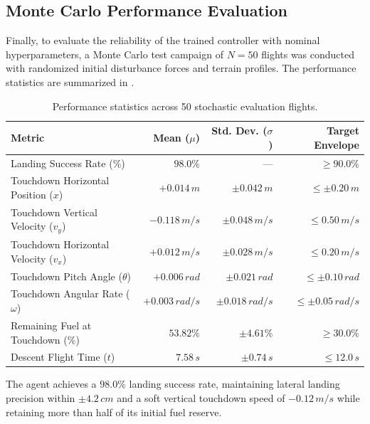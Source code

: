 \subsection{Monte Carlo Performance Evaluation}
Finally, to evaluate the reliability of the trained controller with nominal hyperparameters, a Monte Carlo test campaign of $N=50$ flights was conducted with randomized initial disturbance forces and terrain profiles. The performance statistics are summarized in .

\begin{table}[H]
    \centering
    \footnotesize
    \caption{Performance statistics across 50 stochastic evaluation flights.}
    \label{tab:touchdown_metrics}
    \begin{tabular}{lrrr}
        \toprule
        \textbf{Metric}                       & \textbf{Mean ($\mu$)} & \textbf{Std. Dev. ($\sigma$)} & \textbf{Target Envelope}   \\
        \midrule
        Landing Success Rate (\%)             & $98.0\%$              & ---                           & $\ge 90.0\%$               \\
        Touchdown Horizontal Position ($x$)   & $+0.014\,\si{m}$      & $\pm 0.042\,\si{m}$           & $\le \pm 0.20\,\si{m}$     \\
        Touchdown Vertical Velocity ($v_y$)   & $-0.118\,\si{m/s}$    & $\pm 0.048\,\si{m/s}$         & $\le 0.50\,\si{m/s}$       \\
        Touchdown Horizontal Velocity ($v_x$) & $+0.012\,\si{m/s}$    & $\pm 0.028\,\si{m/s}$         & $\le 0.20\,\si{m/s}$       \\
        Touchdown Pitch Angle ($\theta$)      & $+0.006\,\si{rad}$    & $\pm 0.021\,\si{rad}$         & $\le \pm 0.10\,\si{rad}$   \\
        Touchdown Angular Rate ($\omega$)     & $+0.003\,\si{rad/s}$  & $\pm 0.018\,\si{rad/s}$       & $\le \pm 0.05\,\si{rad/s}$ \\
        Remaining Fuel at Touchdown (\%)      & $53.82\%$             & $\pm 4.61\%$                  & $\ge 30.0\%$               \\
        Descent Flight Time ($t$)             & $7.58\,\si{s}$        & $\pm 0.74\,\si{s}$            & $\le 12.0\,\si{s}$         \\
        \bottomrule
    \end{tabular}
\end{table}

The agent achieves a $98.0\%$ landing success rate, maintaining lateral landing precision within $\pm 4.2\,\si{cm}$ and a soft vertical touchdown speed of $-0.12\,\si{m/s}$ while retaining more than half of its initial fuel reserve.
